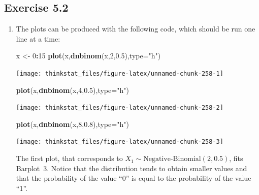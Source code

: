 \documentclass[]{krantz}
\makeatletter
\newenvironment{Shaded}{\begin{snugshade}}{\end{snugshade}}
\newcommand{\KeywordTok}[1]{\textcolor[rgb]{0.13,0.29,0.53}{\textbf{#1}}}
\newcommand{\DataTypeTok}[1]{\textcolor[rgb]{0.13,0.29,0.53}{#1}}
\newcommand{\DecValTok}[1]{\textcolor[rgb]{0.00,0.00,0.81}{#1}}
\newcommand{\FloatTok}[1]{\textcolor[rgb]{0.00,0.00,0.81}{#1}}
\newcommand{\StringTok}[1]{\textcolor[rgb]{0.31,0.60,0.02}{#1}}
\newcommand{\OperatorTok}[1]{\textcolor[rgb]{0.81,0.36,0.00}{\textbf{#1}}}
\newcommand{\NormalTok}[1]{#1}
\newenvironment{kframe}{%
\medskip{}
\setlength{\fboxsep}{.8em}
 \def\at@end@of@kframe{}%
 \ifinner\ifhmode%
  \def\at@end@of@kframe{\end{minipage}}%
  \begin{minipage}{\columnwidth}%
 \fi\fi%
 \def\FrameCommand##1{\hskip\@totalleftmargin \hskip-\fboxsep
 \colorbox{shadecolor}{##1}\hskip-\fboxsep
     \hskip-\linewidth \hskip-\@totalleftmargin \hskip\columnwidth}%
 \MakeFramed {\advance\hsize-\width
   \@totalleftmargin\z@ \linewidth\hsize
   \@setminipage}}%
 {\par\unskip\endMakeFramed%
 \at@end@of@kframe}
\renewenvironment{Shaded}{\begin{kframe}}{\end{kframe}}
\theoremstyle{definition}
\theoremstyle{definition}
\theoremstyle{definition}
\theoremstyle{remark}
\makeatother
\begin{document}
\subsection*{Exercise 5.2}\label{exercise-5.2}


\begin{enumerate}
\def\labelenumi{\arabic{enumi}.}
\item
  The plots can be produced with the following code, which should be run
  one line at a time:

\begin{Shaded}
\begin{Highlighting}[]
\NormalTok{x <-}\StringTok{ }\DecValTok{0}\OperatorTok{:}\DecValTok{15}
\KeywordTok{plot}\NormalTok{(x,}\KeywordTok{dnbinom}\NormalTok{(x,}\DecValTok{2}\NormalTok{,}\FloatTok{0.5}\NormalTok{),}\DataTypeTok{type=}\StringTok{"h"}\NormalTok{)}
\end{Highlighting}
\end{Shaded}

  \begin{center}\texttt{[image: thinkstat\_files/figure-latex/unnamed-chunk-258-1]} \end{center}

\begin{Shaded}
\begin{Highlighting}[]
\KeywordTok{plot}\NormalTok{(x,}\KeywordTok{dnbinom}\NormalTok{(x,}\DecValTok{4}\NormalTok{,}\FloatTok{0.5}\NormalTok{),}\DataTypeTok{type=}\StringTok{"h"}\NormalTok{)}
\end{Highlighting}
\end{Shaded}

  \begin{center}\texttt{[image: thinkstat\_files/figure-latex/unnamed-chunk-258-2]} \end{center}

\begin{Shaded}
\begin{Highlighting}[]
\KeywordTok{plot}\NormalTok{(x,}\KeywordTok{dnbinom}\NormalTok{(x,}\DecValTok{8}\NormalTok{,}\FloatTok{0.8}\NormalTok{),}\DataTypeTok{type=}\StringTok{"h"}\NormalTok{)}
\end{Highlighting}
\end{Shaded}

  \begin{center}\texttt{[image: thinkstat\_files/figure-latex/unnamed-chunk-258-3]} \end{center}

  The first plot, that corresponds to
  \(X_1 \sim \mbox{Negative-Binomial}(2,0.5)\), fits Barplot~3. Notice
  that the distribution tends to obtain smaller values and that the
  probability of the value ``0'' is equal to the probability of the
  value ``1''.


\end{enumerate}
\end{document}

